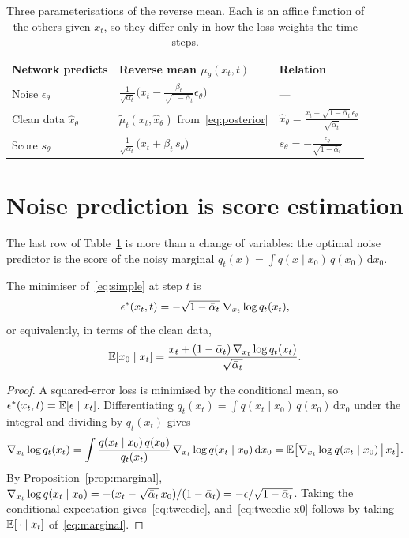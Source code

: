\begin{table}[t]
  \centering
  \caption{Three parameterisations of the reverse mean. Each is an affine function of the others given $x_t$, so they differ only in how the loss weights the time steps.}\label{tab:param}
  \begin{tabular}{lll}
    \toprule
    Network predicts & Reverse mean $\mu_\theta(x_t, t)$ & Relation \\
    \midrule
    Noise $\epsilon_\theta$ & $\frac{1}{\sqrt{\alpha_t}}\big(x_t - \frac{\beta_t}{\sqrt{1-\bar\alpha_t}}\epsilon_\theta\big)$ & --- \\
    Clean data $\hat x_\theta$ & $\tilde\mu_t(x_t, \hat x_\theta)$ from~\eqref{eq:posterior} & $\hat x_\theta = \frac{x_t - \sqrt{1-\bar\alpha_t}\,\epsilon_\theta}{\sqrt{\bar\alpha_t}}$ \\
    Score $s_\theta$ & $\frac{1}{\sqrt{\alpha_t}}\big(x_t + \beta_t\, s_\theta\big)$ & $s_\theta = -\frac{\epsilon_\theta}{\sqrt{1-\bar\alpha_t}}$ \\
    \bottomrule
  \end{tabular}
\end{table}

\section{Noise prediction is score estimation}\label{sec:score}
The last row of Table~\ref{tab:param} is more than a change of variables: the optimal noise predictor is the score of the noisy marginal $q_t(x) = \int q(x \mid x_0)\,q(x_0)\,\mathrm{d}x_0$.

\begin{proposition}\label{prop:tweedie}
The minimiser of~\eqref{eq:simple} at step $t$ is
\begin{equation}\label{eq:tweedie}
  \epsilon^*(x_t, t) = -\sqrt{1-\bar\alpha_t}\;\nabla_{x_t} \log q_t(x_t),
\end{equation}
or equivalently, in terms of the clean data,
\begin{equation}\label{eq:tweedie-x0}
  \mathbb{E}[x_0 \mid x_t] = \frac{x_t + (1-\bar\alpha_t)\,\nabla_{x_t} \log q_t(x_t)}{\sqrt{\bar\alpha_t}} .
\end{equation}
\end{proposition}

\begin{proof}
A squared-error loss is minimised by the conditional mean, so $\epsilon^*(x_t, t) = \mathbb{E}[\epsilon \mid x_t]$.
Differentiating $q_t(x_t) = \int q(x_t \mid x_0)\,q(x_0)\,\mathrm{d}x_0$ under the integral and dividing by $q_t(x_t)$ gives
\begin{equation*}
  \nabla_{x_t} \log q_t(x_t) = \int \frac{q(x_t \mid x_0)\,q(x_0)}{q_t(x_t)}\,\nabla_{x_t} \log q(x_t \mid x_0)\,\mathrm{d}x_0
  = \mathbb{E}\big[\nabla_{x_t} \log q(x_t \mid x_0) \,\big|\, x_t\big].
\end{equation*}
By Proposition~\ref{prop:marginal}, $\nabla_{x_t} \log q(x_t \mid x_0) = -(x_t - \sqrt{\bar\alpha_t}\,x_0)/(1-\bar\alpha_t) = -\epsilon/\sqrt{1-\bar\alpha_t}$.
Taking the conditional expectation gives~\eqref{eq:tweedie}, and~\eqref{eq:tweedie-x0} follows by taking $\mathbb{E}[\,\cdot \mid x_t]$ of~\eqref{eq:marginal}.
\end{proof}

